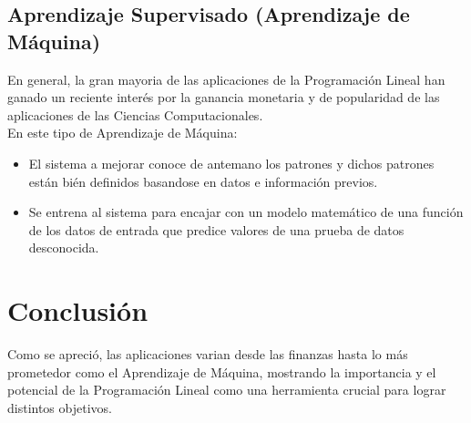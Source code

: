 \documentclass[letterpaper, 12pt]{article}
\begin{document}
        \subsection{Aprendizaje Supervisado (Aprendizaje de Máquina)}
        \justify
        En general, la gran mayoria de las aplicaciones de la Programación Lineal han ganado un reciente interés por la ganancia monetaria y de popularidad de las aplicaciones de las Ciencias Computacionales.
        \\ \newline
        En este tipo de Aprendizaje de Máquina:
        \begin{itemize}
            \item El sistema a mejorar conoce de antemano los patrones y dichos patrones están bién definidos basandose en datos e información previos.
            \item Se entrena al sistema para encajar con un modelo matemático de una función de los datos de entrada que predice valores de una prueba de datos desconocida.
        \end{itemize}
    \section{Conclusión}
    \justify
    Como se apreció, las aplicaciones varian desde las finanzas hasta lo más prometedor como el Aprendizaje de Máquina, mostrando la importancia y el potencial de la Programación Lineal como una herramienta crucial para
    lograr distintos objetivos.

    \newpage
    \lhead{}
    \printbibliography
\end{document}
